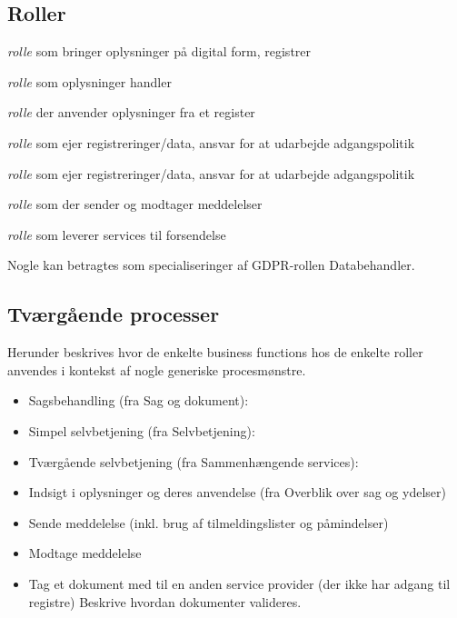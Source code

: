 \subsection{Roller}\label{roller}

\begin{description}
\tightlist
\item[Registrant]
\emph{rolle} som bringer oplysninger på digital form, registrer
\item[Datasubject]
\emph{rolle} som oplysninger handler
\item[Dataanvender]
\emph{rolle} der anvender oplysninger fra et register
\item[Dataejer]
\emph{rolle} som ejer registreringer/data, ansvar for at udarbejde
adgangspolitik
\item[Datadistributør]
\emph{rolle} som ejer registreringer/data, ansvar for at udarbejde
adgangspolitik
\item[Messaging User]
\emph{rolle} som der sender og modtager meddelelser
\item[Messaging Provider]
\emph{rolle} som leverer services til forsendelse
\end{description}

Nogle kan betragtes som specialiseringer af GDPR-rollen Databehandler.

\subsection{Tværgående processer}\label{tvuxe6rguxe5ende-processer}

Herunder beskrives hvor de enkelte business functions hos de enkelte
roller anvendes i kontekst af nogle generiske procesmønstre.

\begin{itemize}
\tightlist
\item
  Sagsbehandling (fra Sag og dokument):
\item
  Simpel selvbetjening (fra Selvbetjening):
\item
  Tværgående selvbetjening (fra Sammenhængende services):
\item
  Indsigt i oplysninger og deres anvendelse (fra Overblik over sag og
  ydelser)
\item
  Sende meddelelse (inkl. brug af tilmeldingslister og påmindelser)
\item
  Modtage meddelelse
\item
  Tag et dokument med til en anden service provider (der ikke har adgang
  til registre) Beskrive hvordan dokumenter valideres.
\end{itemize}

